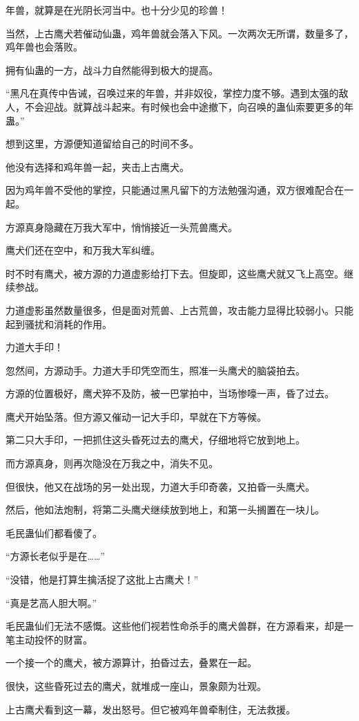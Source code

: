 \begin{this_body}
年兽，就算是在光阴长河当中。也十分少见的珍兽！

当然，上古鹰犬若催动仙蛊，鸡年兽就会落入下风。一次两次无所谓，数量多了，鸡年兽也会落败。

拥有仙蛊的一方，战斗力自然能得到极大的提高。

“黑凡在真传中告诫，召唤过来的年兽，并非奴役，掌控力度不够。遇到太强的敌人，不会迎战。就算战斗起来。有时候也会中途撤下，向召唤的蛊仙索要更多的年蛊。”

想到这里，方源便知道留给自己的时间不多。

他没有选择和鸡年兽一起，夹击上古鹰犬。

因为鸡年兽不受他的掌控，只能通过黑凡留下的方法勉强沟通，双方很难配合在一起。

方源真身隐藏在万我大军中，悄悄接近一头荒兽鹰犬。

鹰犬们还在空中，和万我大军纠缠。

时不时有鹰犬，被方源的力道虚影给打下去。但旋即，这些鹰犬就又飞上高空。继续参战。

力道虚影虽然数量很多，但是面对荒兽、上古荒兽，攻击能力显得比较弱小。只能起到骚扰和消耗的作用。

力道大手印！

忽然间，方源动手。力道大手印凭空而生，照准一头鹰犬的脑袋拍去。

方源的位置极好，鹰犬猝不及防，被一巴掌拍中，当场惨嚎一声，昏了过去。

鹰犬开始坠落。但方源又催动一记大手印，早就在下方等候。

第二只大手印，一把抓住这头昏死过去的鹰犬，仔细地将它放到地上。

而方源真身，则再次隐没在万我之中，消失不见。

但很快，他又在战场的另一处出现，力道大手印奇袭，又拍昏一头鹰犬。

然后，他如法炮制，将第二头鹰犬继续放到地上，和第一头搁置在一块儿。

毛民蛊仙们都看傻了。

“方源长老似乎是在……”

“没错，他是打算生擒活捉了这批上古鹰犬！”

“真是艺高人胆大啊。”

毛民蛊仙们无法不感慨。这些他们视若性命杀手的鹰犬兽群，在方源看来，却是一笔主动投怀的财富。

一个接一个的鹰犬，被方源算计，拍昏过去，叠累在一起。

很快，这些昏死过去的鹰犬，就堆成一座山，景象颇为壮观。

上古鹰犬看到这一幕，发出怒号。但它被鸡年兽牵制住，无法救援。


\end{this_body}
